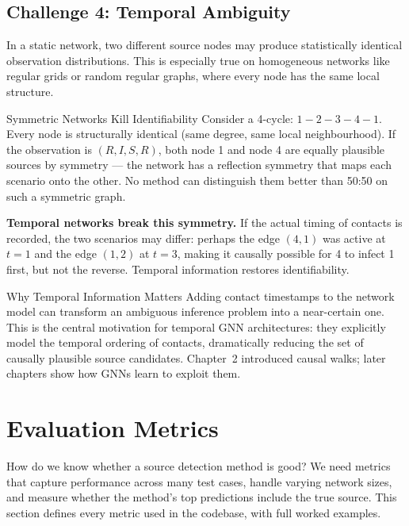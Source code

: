 \subsection{Challenge 4: Temporal Ambiguity}

In a static network, two different source nodes may produce
statistically identical observation distributions. This is especially true
on homogeneous networks like regular grids or random regular graphs, where
every node has the same local structure.

\begin{examplebox}{Symmetric Networks Kill Identifiability}
Consider a 4-cycle: $1 - 2 - 3 - 4 - 1$. Every node is structurally
identical (same degree, same local neighbourhood). If the observation is
$(R, I, S, R)$, both node 1 and node 4 are equally plausible sources by
symmetry — the network has a reflection symmetry that maps each scenario
onto the other. No method can distinguish them better than 50:50 on such
a symmetric graph.

\textbf{Temporal networks break this symmetry.} If the actual timing of
contacts is recorded, the two scenarios may differ: perhaps the edge
$(4, 1)$ was active at $t=1$ and the edge $(1, 2)$ at $t=3$, making it
causally possible for 4 to infect 1 first, but not the reverse. Temporal
information restores identifiability.
\end{examplebox}

\begin{keyinsight}{Why Temporal Information Matters}
Adding contact timestamps to the network model can transform an ambiguous
inference problem into a near-certain one. This is the central motivation
for temporal GNN architectures: they explicitly model the temporal
ordering of contacts, dramatically reducing the set of causally plausible
source candidates. Chapter~2 introduced causal walks; later chapters show
how GNNs learn to exploit them.
\end{keyinsight}

\section{Evaluation Metrics}
\label{sec:evaluation-metrics}

How do we know whether a source detection method is good? We need metrics
that capture performance across many test cases, handle varying network
sizes, and measure whether the method's top predictions include the true
source. This section defines every metric used in the codebase, with full
worked examples.

